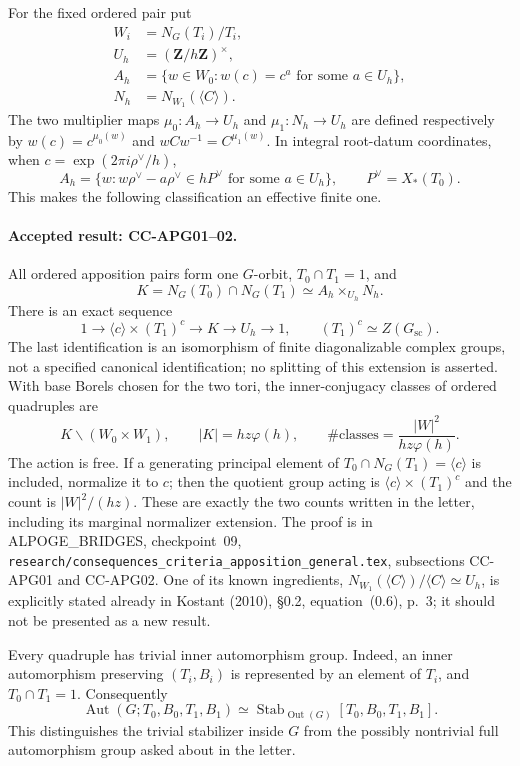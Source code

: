 For the fixed ordered pair put
\[
\begin{split}
 W_i&=N_G(T_i)/T_i,\\
 U_h&=(\mathbf Z/h\mathbf Z)^\times,\\
 A_h&=\{w\in W_0:w(c)=c^a\text{ for some }a\in U_h\},\\
 N_h&=N_{W_1}(\langle C\rangle).
\end{split}
\]
The two multiplier maps $\mu_0:A_h\to U_h$ and
$\mu_1:N_h\to U_h$ are defined respectively by $w(c)=c^{\mu_0(w)}$
and $wCw^{-1}=C^{\mu_1(w)}$.  In integral root-datum coordinates,
when $c=\exp(2\pi i\rho^\vee/h)$,
\[
 A_h=\{w:w\rho^\vee-a\rho^\vee\in hP^\vee
                  \text{ for some }a\in U_h\},
 \qquad P^\vee=X_*(T_0).
\]
This makes the following classification an effective finite one.

\paragraph{Accepted result: CC-APG01--02.}
All ordered apposition pairs form one $G$-orbit,
$T_0\cap T_1=1$, and
\[
 K=N_G(T_0)\cap N_G(T_1)
   \simeq A_h\times_{U_h}N_h.
\]
There is an exact sequence
\[
 1\longrightarrow \langle c\rangle\times (T_1)^c
 \longrightarrow K\longrightarrow U_h\longrightarrow1,
 \qquad (T_1)^c\simeq Z(G_{\mathrm{sc}}).
\]
The last identification is an isomorphism of finite diagonalizable
complex groups, not a specified canonical identification; no splitting
of this extension is asserted.  With base Borels chosen for the two
tori, the inner-conjugacy classes of ordered quadruples are
\[
 K\backslash(W_0\times W_1),\qquad
 |K|=hz\varphi(h),\qquad
 \#\text{classes}=\frac{|W|^2}{hz\varphi(h)}.
\]
The action is free.  If a generating principal element of
$T_0\cap N_G(T_1)=\langle c\rangle$ is included, normalize it to $c$;
then the quotient group acting is $\langle c\rangle\times(T_1)^c$
and the count is $|W|^2/(hz)$.  These are exactly the two counts
written in the letter, including its marginal normalizer extension.
The proof is in ALPOGE\_BRIDGES, checkpoint~09,
\texttt{research/consequences\_criteria\_apposition\_general.tex},
subsections CC-APG01 and CC-APG02.  One of its known ingredients,
$N_{W_1}(\langle C\rangle)/\langle C\rangle\simeq U_h$,
is explicitly stated already in Kostant (2010), \S0.2,
equation~(0.6), p.~3; it should not be presented as a new result.

Every quadruple has trivial inner automorphism group.  Indeed, an
inner automorphism preserving $(T_i,B_i)$ is represented by an element
of $T_i$, and $T_0\cap T_1=1$.  Consequently
\[
 \operatorname{Aut}(G;T_0,B_0,T_1,B_1)
 \simeq\operatorname{Stab}_{\operatorname{Out}(G)}
       [T_0,B_0,T_1,B_1].
\]
This distinguishes the trivial stabilizer inside $G$ from the possibly
nontrivial full automorphism group asked about in the letter.

